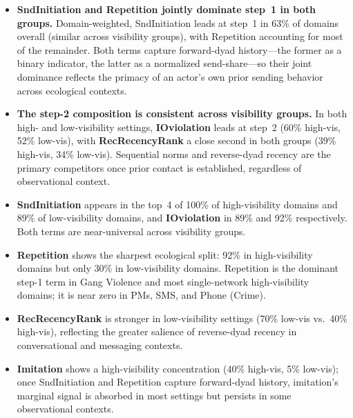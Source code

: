 \documentclass[11pt]{article}
\begin{document}
\begin{itemize}[leftmargin=2em]
  \item \textbf{SndInitiation and Repetition jointly dominate step~1 in both
        groups.} Domain-weighted, SndInitiation leads at step~1 in 63\% of
        domains overall (similar across visibility groups), with
        Repetition accounting for most of the remainder.
        Both terms capture forward-dyad history---the former as
        a binary indicator, the latter as a normalized send-share---so their
        joint dominance reflects the primacy of an actor's own prior sending
        behavior across ecological contexts.

  \item \textbf{The step-2 composition is consistent across visibility groups.}
        In both high- and low-visibility settings, \textbf{IOviolation} leads
        at step~2 (60\% high-vis, 52\% low-vis), with \textbf{RecRecencyRank}
        a close second in both groups (39\% high-vis, 34\% low-vis). Sequential
        norms and reverse-dyad recency are the primary competitors once prior
        contact is established, regardless of observational context.

  \item \textbf{SndInitiation} appears in the top~4 of 100\% of high-visibility
        domains and 89\% of low-visibility domains, and \textbf{IOviolation}
        in 89\% and 92\% respectively. Both terms are near-universal across
        visibility groups.

  \item \textbf{Repetition} shows the sharpest ecological split: 92\% in
        high-visibility domains but only 30\% in low-visibility domains.
        Repetition is the dominant step-1 term in Gang Violence and most
        single-network high-visibility domains; it is near zero in PMs, SMS,
        and Phone (Crime).

  \item \textbf{RecRecencyRank} is stronger in low-visibility settings
        (70\% low-vis vs.\ 40\% high-vis), reflecting the greater salience
        of reverse-dyad recency in conversational and messaging contexts.

  \item \textbf{Imitation} shows a high-visibility concentration
        (40\% high-vis, 5\% low-vis); once SndInitiation and Repetition
        capture forward-dyad history, imitation's marginal signal is absorbed
        in most settings but persists in some observational contexts.
\end{itemize}
\end{document}
